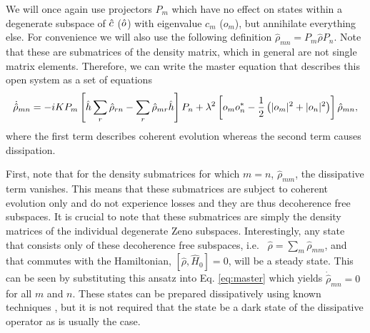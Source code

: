 We will once again use projectors $P_m$ which have no effect on states
within a degenerate subspace of $\hat{c}$ ($\hat{o}$) with eigenvalue $c_m$
($o_m$), but annihilate everything else. For convenience we will also
use the following definition $\hat{\rho}_{mn} = P_m \hat{\rho} P_n$.
Note that these are submatrices of the density matrix, which in
general are not single matrix elements. Therefore, we can write the
master equation that describes this open system as a set of equations
\begin{equation}
\label{eq:master}
  \dot{\hat{\rho}}_{mn} =  -i K P_m \left[ \hat{h} \sum_r \hat{\rho}_{rn}
    - \sum_r \hat{\rho}_{mr} \hat{h} \right] P_n + \lambda^2 \left[ o_m
    o_n^*  - \frac{1}{2} \left( |o_m|^2 + |o_n|^2 \right) \right] \hat{\rho}_{mn},
\end{equation}
where the first term describes coherent evolution whereas the second
term causes dissipation. 

First, note that for the density submatrices for which $m = n$,
$\hat{\rho}_{mm}$, the dissipative term vanishes. This means that
these submatrices are subject to coherent evolution only and do not
experience losses and they are thus decoherence free subspaces. It is
crucial to note that these submatrices are simply the density matrices
of the individual degenerate Zeno subspaces. Interestingly, any state
that consists only of these decoherence free subspaces, i.e.~
$\hat{\rho} = \sum_m \hat{\rho}_{mm}$, and that commutes with the
Hamiltonian, $[\hat{\rho}, \hat{H}_0] = 0$, will be a steady state.
This can be seen by substituting this ansatz into
Eq. \eqref{eq:master} which yields $\dot{\hat{\rho}}_{mn} = 0$ for all
$m$ and $n$. These states can be prepared dissipatively using known
techniques \cite{diehl2008}, but it is not required that the state be
a dark state of the dissipative operator as is usually the case.

